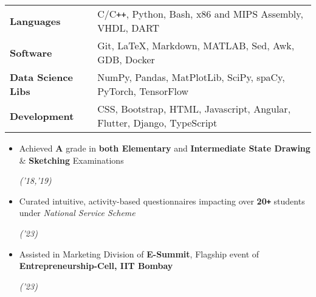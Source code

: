 \documentclass[10pt]{article}
\def\Plus{\texttt{\texttt{+}}}
\newcommand{\xfill}[2][1ex]{
	\dimen0=#2\advance\dimen0 by #1
	\leaders\hrule height \dimen0 depth -#1\hfill
}
\renewcommand{\section}[1]{
	\vspace{5pt}
	{\color{Blue}{\Large\scshape\raggedright #1\xfill[0pt]{0.5pt}}}
}
\newcommand{\filldate}[1]{\strut\hfill {\small \textit{(#1)}}}
\begin{document}
\vspace{2pt}
\section{Technical Skills}

\vspace{3pt}
\begin{tabularx}{\textwidth}{ p{4cm}  m{13.5cm} }
	\textbf{Languages} \vspace{3pt} & \vspace{2pt}C/C\Plus\Plus, Python, Bash, x86 and MIPS Assembly, VHDL, DART\\ 
	\textbf{Software}\vspace{3pt} & Git, \LaTeX, Markdown, MATLAB, Sed, Awk, GDB, Docker\\
	\textbf{Data Science Libs}\vspace{3pt} & NumPy, Pandas, MatPlotLib, SciPy, spaCy, PyTorch, TensorFlow \\
	\textbf{Development}\vspace{3pt} & CSS, Bootstrap, HTML, Javascript, Angular, Flutter, Django, TypeScript \\
 
\end{tabularx}
\vspace{-5pt}

\section{Extracurricular Activities}

\begin{itemize}
    \item Achieved \textbf{A} grade in \textbf{both Elementary} and \textbf{Intermediate State Drawing }\&\textbf{ Sketching} Examinations\filldate{'18,'19}
    \item Curated intuitive, activity-based questionnaires impacting over \textbf{20\Plus} students under \textit{National Service Scheme}\filldate{'23}
    \item Assisted in Marketing Division of \textbf{E-Summit}, Flagship event of\textbf{ Entrepreneurship-Cell, IIT Bombay}\filldate{'23}
    
\end{itemize}
\end{document}
